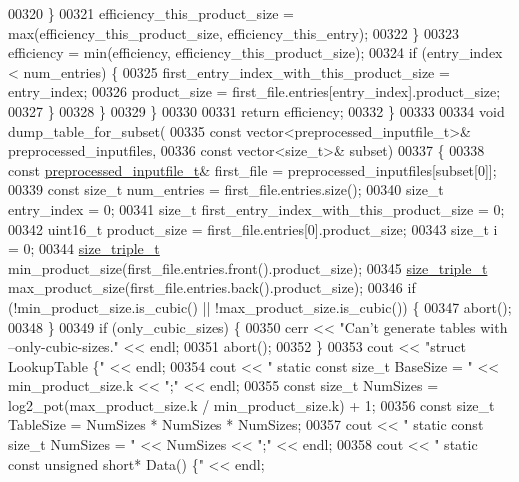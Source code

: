 \begin{DoxyCode}
{{00320         \}
00321         efficiency\_this\_product\_size = max(efficiency\_this\_product\_size, efficiency\_this\_entry);
00322       \}
00323       efficiency = min(efficiency, efficiency\_this\_product\_size);
00324       \textcolor{keywordflow}{if} (entry\_index < num\_entries) \{
00325         first\_entry\_index\_with\_this\_product\_size = entry\_index;
00326         product\_size = first\_file.entries[entry\_index].product\_size;
00327       \}
00328     \}
00329   \}
00330 
00331   \textcolor{keywordflow}{return} efficiency;
00332 \}
00333 
00334 \textcolor{keywordtype}{void} dump\_table\_for\_subset(
00335         \textcolor{keyword}{const} vector<preprocessed\_inputfile\_t>& preprocessed\_inputfiles,
00336         \textcolor{keyword}{const} vector<size\_t>& subset)
00337 \{
00338   \textcolor{keyword}{const} \hyperlink{structpreprocessed__inputfile__t}{preprocessed\_inputfile\_t}& first\_file = preprocessed\_inputfiles[subset[0]];
00339   \textcolor{keyword}{const} \textcolor{keywordtype}{size\_t} num\_entries = first\_file.entries.size();
00340   \textcolor{keywordtype}{size\_t} entry\_index = 0;
00341   \textcolor{keywordtype}{size\_t} first\_entry\_index\_with\_this\_product\_size = 0;
00342   uint16\_t product\_size = first\_file.entries[0].product\_size;
00343   \textcolor{keywordtype}{size\_t} i = 0;
00344   \hyperlink{structsize__triple__t}{size\_triple\_t} min\_product\_size(first\_file.entries.front().product\_size);
00345   \hyperlink{structsize__triple__t}{size\_triple\_t} max\_product\_size(first\_file.entries.back().product\_size);
00346   \textcolor{keywordflow}{if} (!min\_product\_size.is\_cubic() || !max\_product\_size.is\_cubic()) \{
00347     abort();
00348   \}
00349   \textcolor{keywordflow}{if} (only\_cubic\_sizes) \{
00350     cerr << \textcolor{stringliteral}{"Can't generate tables with --only-cubic-sizes."} << endl;
00351     abort();
00352   \}
00353   cout << \textcolor{stringliteral}{"struct LookupTable \{"} << endl;
00354   cout << \textcolor{stringliteral}{"  static const size\_t BaseSize = "} << min\_product\_size.k << \textcolor{stringliteral}{";"} << endl;
00355   \textcolor{keyword}{const} \textcolor{keywordtype}{size\_t} NumSizes = log2\_pot(max\_product\_size.k / min\_product\_size.k) + 1;
00356   \textcolor{keyword}{const} \textcolor{keywordtype}{size\_t} TableSize = NumSizes * NumSizes * NumSizes;
00357   cout << \textcolor{stringliteral}{"  static const size\_t NumSizes = "} << NumSizes << \textcolor{stringliteral}{";"} << endl;
00358   cout << \textcolor{stringliteral}{"  static const unsigned short* Data() \{"} << endl;
}}
\end{DoxyCode}
